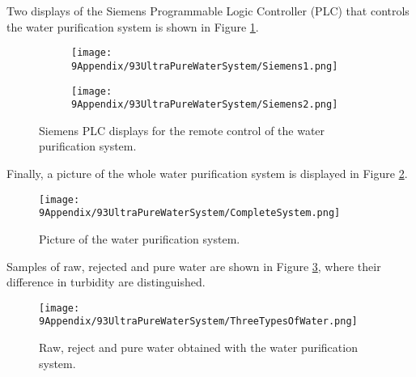 Two displays of the Siemens Programmable Logic Controller (PLC) that controls the water purification system is shown in Figure \ref{fig:Siemens}.
\begin{figure}
\centering
    \begin{subfigure}[b]{0.6\textwidth}
    \centering
    \texttt{[image: 9Appendix/93UltraPureWaterSystem/Siemens1.png]}  
    \caption{}
    \end{subfigure}
    \hfill
    \begin{subfigure}[b]{0.6\textwidth}
    \centering
    \texttt{[image: 9Appendix/93UltraPureWaterSystem/Siemens2.png]}  
    \caption{}
    \end{subfigure}
 \caption{Siemens PLC displays for the remote control of the water purification system.}
 \label{fig:Siemens}
\end{figure}
Finally, a picture of the whole water purification system is displayed in Figure \ref{fig:CompleteSystem}.
\begin{figure}[htbp]
\centering
\texttt{[image: 9Appendix/93UltraPureWaterSystem/CompleteSystem.png]}
\caption{Picture of the water purification system.\label{fig:CompleteSystem}}
\end{figure}
Samples of raw, rejected and pure water are shown in Figure \ref{fig:ThreeTypesOfWater}, where their difference in turbidity are distinguished.
\begin{figure}[htbp]
\centering
\texttt{[image: 9Appendix/93UltraPureWaterSystem/ThreeTypesOfWater.png]}
\caption{Raw, reject and pure water obtained with the water purification system.\label{fig:ThreeTypesOfWater}}
\end{figure}